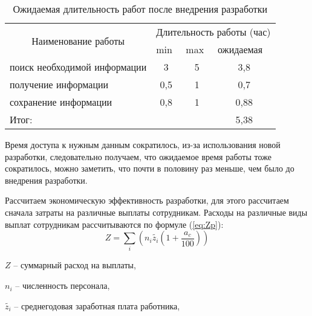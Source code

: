 \begin{table}[H]
\caption{Ожидаемая длительность работ после внедрения разработки }
\label{tabular:PosleTime}
\begin{center}
\begin{tabular}{|l|c|c|c|}
\hline
\multicolumn{1}{|c|}{\multirow{2}{*}{Наименование работы}} & \multicolumn{3}{c|}{Длительность работы (час)}                                       \\ \cline{2-4} 
\multicolumn{1}{|c|}{}                                     & \multicolumn{1}{l|}{min} & \multicolumn{1}{l|}{max} & \multicolumn{1}{l|}{ожидаемая} \\ \hline
поиск необходимой информации                               & 3                        & 5                        & 3,8                              \\ \hline
получение информации                                       & 0,5                        & 1                        & 0,7                              \\ \hline
сохранение информации                                      & 0,8                        & 1                        & 0,88                              \\ \hline
\multicolumn{3}{|l|}{Итог:}                                                                                      & 5,38                             \\ \hline
\end{tabular}
\end{center}
\end{table}

Время доступа к нужным данным сократилось, из-за использования новой разработки, следовательно получаем, что ожидаемое время работы тоже сократилось, можно заметить, что почти в половину раз меньше, чем было до внедрения разработки.

Рассчитаем экономическую эффективность разработки, для этого рассчитаем сначала затраты на различные выплаты сотрудникам. 
Расходы на различные виды выплат сотрудникам рассчитываются по формуле (\ref{eq:Zp}):
\begin{equation}\label{eq:Zp}
Z = \sum_{i}^{}{\left(n_{i}\tilde{z_{i}}\left(1+\frac{a_{c}}{100} \right) \right)}
\end{equation}

$Z$ -- суммарный расход на выплаты,

$n_{i}$ -- численность персонала,

$\tilde{z_{i}}$ -- среднегодовая заработная плата работника,

